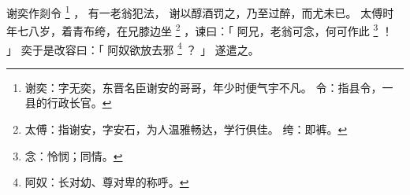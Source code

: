
\switchcolumn*[\section{}]

谢奕作剡令%
\footnote{%
    谢奕：字无奕，东晋名臣谢安的哥哥，年少时便气宇不凡。
    令：指县令，一县的行政长官。
}%
，
有一老翁犯法，
谢以醇酒罚之，乃至过醉，而尤未已。
太傅时年七八岁，着青布绔，在兄膝边坐%
\footnote{%
    太傅：指谢安，字安石，为人温雅畅达，学行俱佳。
    绔：即裤。
}%
，谏曰：「
    阿兄，老翁可念，何可作此%
    \footnote{%
        念：怜悯；同情。
    }%
    ！
」
奕于是改容曰：「
    阿奴欲放去邪%
    \footnote{%
        阿奴：长对幼、尊对卑的称呼。
    }%
    ？
」
遂遣之。

\switchcolumn



